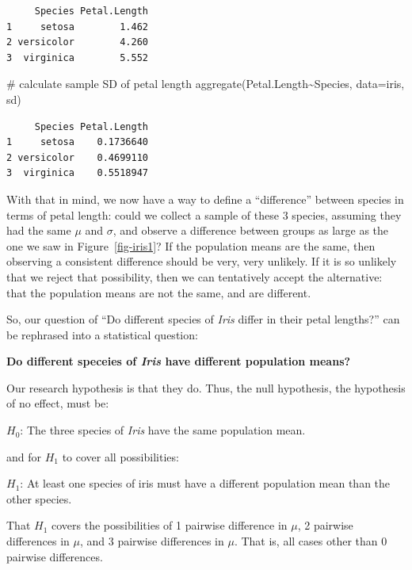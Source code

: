 \documentclass[
  13,
  letterpaper,
]{report}
\newenvironment{Shaded}{\begin{snugshade}}{\end{snugshade}}
\newcommand{\AttributeTok}[1]{\textcolor[rgb]{0.40,0.45,0.13}{#1}}
\newcommand{\CommentTok}[1]{\textcolor[rgb]{0.37,0.37,0.37}{#1}}
\newcommand{\FunctionTok}[1]{\textcolor[rgb]{0.28,0.35,0.67}{#1}}
\newcommand{\NormalTok}[1]{\textcolor[rgb]{0.00,0.23,0.31}{#1}}
\newcommand{\SpecialCharTok}[1]{\textcolor[rgb]{0.37,0.37,0.37}{#1}}
\begin{document}
\begin{verbatim}
     Species Petal.Length
1     setosa        1.462
2 versicolor        4.260
3  virginica        5.552
\end{verbatim}

\begin{Shaded}
\begin{Highlighting}[]
\CommentTok{\# calculate sample SD of petal length}
\FunctionTok{aggregate}\NormalTok{(Petal.Length}\SpecialCharTok{\textasciitilde{}}\NormalTok{Species, }\AttributeTok{data=}\NormalTok{iris, sd)}
\end{Highlighting}
\end{Shaded}

\begin{verbatim}
     Species Petal.Length
1     setosa    0.1736640
2 versicolor    0.4699110
3  virginica    0.5518947
\end{verbatim}

With that in mind, we now have a way to define a ``difference'' between
species in terms of petal length: could we collect a sample of these 3
species, assuming they had the same \(\mu\) and \(\sigma\), and observe
a difference between groups as large as the one we saw in
Figure~\ref{fig-iris1}? If the population means are the same, then
observing a consistent difference should be very, very unlikely. If it
is so unlikely that we reject that possibility, then we can tentatively
accept the alternative: that the population means are not the same, and
are different.

So, our question of ``Do different species of \emph{Iris} differ in
their petal lengths?'' can be rephrased into a statistical question:

\textbf{Do different speceies of \emph{Iris} have different population
means?}

Our research hypothesis is that they do. Thus, the null hypothesis, the
hypothesis of no effect, must be:

\(H_0\): The three species of \emph{Iris} have the same population mean.

and for \(H_1\) to cover all possibilities:

\(H_1\): At least one species of iris must have a different population
mean than the other species.

That \(H_1\) covers the possibilities of 1 pairwise difference in
\(\mu\), 2 pairwise differences in \(\mu\), and 3 pairwise differences
in \(\mu\). That is, all cases other than 0 pairwise differences.
\end{document}
